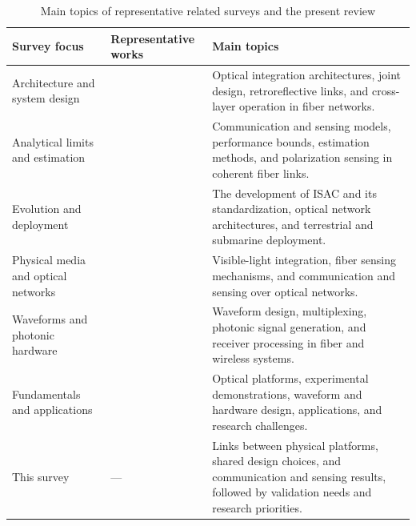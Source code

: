 \begin{table}[!t]
\caption{Main topics of representative related surveys and the present review}
\label{tab:prior_surveys}
\centering
\begingroup
\footnotesize
\setlength{\tabcolsep}{4pt}
\renewcommand{\arraystretch}{1.08}
\begin{tabularx}{\textwidth}{@{}%
>{\raggedright\arraybackslash}p{}
>{\raggedright\arraybackslash}p{}
>{\raggedright\arraybackslash}X@{}}
\toprule
Survey focus & Representative works & Main topics \\
\midrule
Architecture and system design &
\cite{Wen2024OISACArchitectures,Su2025OISACTheoryPractice,
Chu2025ROISACOverview,Wang2026CrossLayerISACoF} &
Optical integration architectures, joint design, retroreflective links,
and cross-layer operation in fiber networks. \\
\addlinespace[2pt]
Analytical limits and estimation &
\cite{Khorasgani2026GeneralOpticalISACSurvey,Rode2025PolarizationISAC} &
Communication and sensing models, performance bounds, estimation methods,
and polarization sensing in coherent fiber links. \\
\addlinespace[2pt]
Evolution and deployment &
\cite{Zhang2026ISACEvolution,Liu2025OpticalNetworkISACProspect,
Cao2026SubmarineFiberISAC,Zhang2026OpticalTransmissionNetworks,
Ip2026DeployedTelecomCableISAC} &
The development of ISAC and its standardization, optical network
architectures, and terrestrial and submarine deployment. \\
\addlinespace[2pt]
Physical media and optical networks &
\cite{Liang2024LiSACReview,Zhang2023OpticalNetworkISACFrontier,
He2025FiberISACAdvances,Liu2026OpticalFiberISACReview,
Lu2026ConvergedFiberISACReview,Wang2026FiberNetworkISAC} &
Visible-light integration, fiber sensing mechanisms, and communication
and sensing over optical networks. \\
\addlinespace[2pt]
Waveforms and photonic hardware &
\cite{Yang2025DSCMISACReview,He2026PhotonicFiberISAC,
Yu2023PhotonAssistedTHz,Bai2025MicrowavePhotonicsISAC,
Wang2025MicrowavePhotonicsISAC,Lyu2026PhotonicTHzWaveforms} &
Waveform design, multiplexing, photonic signal generation,
and receiver processing in fiber and wireless systems. \\
\addlinespace[2pt]
Fundamentals and applications &
\cite{Mohsan2026OISACReview} &
Optical platforms, experimental demonstrations, waveform and hardware
design, applications, and research challenges. \\
\midrule
This survey & --- &
Links between physical platforms, shared design choices, and communication
and sensing results, followed by validation needs and research priorities. \\
\bottomrule
\end{tabularx}
\endgroup
\end{table}

